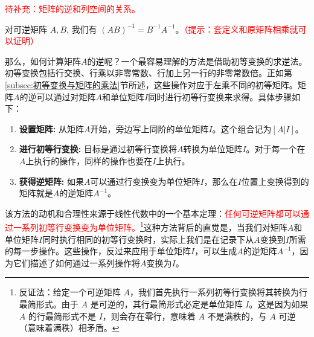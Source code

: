 \textcolor{red}{待补充：矩阵的逆和列空间的关系。}

\begin{theorem}[矩阵的逆的运算性质]
    对可逆矩阵 $A, B$, 我们有 $(A B)^{-1}=B^{-1} A^{-1}$。\textcolor{red}{（提示：套定义和原矩阵相乘就可以证明）}
\end{theorem}

那么，如何计算矩阵\(A\)的逆呢？一个最容易理解的方法是借助初等变换的求逆法。初等变换包括行交换、行乘以非零常数、行加上另一行的非零常数倍。正如第\ref{subsec:初等变换与矩阵的乘法}节所述，这些操作对应于左乘不同的初等矩阵。矩阵\(A\)的逆可以通过对矩阵\(A\)和单位矩阵\(I\)同时进行初等行变换来求得。具体步骤如下：

\begin{enumerate}
    \item \textbf{设置矩阵:} 从矩阵\(A\)开始，旁边写上同阶的单位矩阵\(I\)。这个组合记为\([A|I]\)。
    \item \textbf{进行初等行变换:} 目标是通过初等行变换将\(A\)转换为单位矩阵\(I\)。对于每一个在\(A\)上执行的操作，同样的操作也要在\(I\)上执行。
    \item \textbf{获得逆矩阵:} 如果\(A\)可以通过行变换变为单位矩阵\(I\)，那么在\(I\)位置上变换得到的矩阵就是\(A\)的逆矩阵\(A^{-1}\)。
\end{enumerate}

该方法的动机和合理性来源于线性代数中的一个基本定理：\textcolor{red}{任何可逆矩阵都可以通过一系列初等行变换变为单位矩阵。}\footnote{
反证法：给定一个可逆矩阵 \(A\)，我们首先执行一系列初等行变换将其转换为行最简形式。由于 \(A\) 是可逆的，其行最简形式必定是单位矩阵 \(I\)。这是因为如果 \(A\) 的行最简形式不是 \(I\)，则会存在零行，意味着 \(A\) 不是满秩的，与 \(A\) 可逆（意味着满秩）相矛盾。
}这种方法背后的直觉是，当我们对矩阵\(A\)和单位矩阵\(I\)同时执行相同的初等行变换时，实际上我们是在记录下从\(A\)变换到\(I\)所需的每一步操作。这些操作，反过来应用于单位矩阵\(I\)，可以生成\(A\)的逆矩阵\(A^{-1}\)，因为它们描述了如何通过一系列操作将\(A\)变换为\(I\)。

